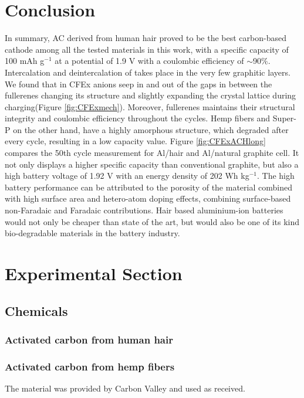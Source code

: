 \documentclass{article}
\begin{document}
\newpage
\section{Conclusion}
In summary, AC derived from human hair proved to be the best carbon-based cathode among all the tested materials in this work, with a specific capacity of 100 mAh g$^{-1}$ at a potential of 1.9 V with a coulombic efficiency of $\sim$90$\%$. Intercalation and deintercalation of  takes place in the very few graphitic layers. We found that in CFEx  anions seep in and out of the gaps in between the fullerenes changing its structure and slightly expanding the crystal lattice during charging(Figure \ref{fig:CFExmech}). Moreover, fullerenes maintains their structural integrity and coulombic efficiency throughout the cycles. Hemp fibers and Super-P on the other hand, have a highly amorphous structure, which degraded after every cycle, resulting in a low capacity value. Figure \ref{fig:CFExACHlong} compares the 50th cycle measurement for Al/hair and Al/natural graphite cell. It not only displays a higher specific capacity than conventional graphite, but also a high battery voltage of 1.92 V with an energy density of 202 Wh kg$^{-1}$. The high battery performance can be attributed to the porosity of the material combined with high surface area and hetero-atom doping effects, combining surface-based non-Faradaic and Faradaic contributions. Hair based aluminium-ion batteries would not only be cheaper than state of the art, but would also be one of its kind bio-degradable materials in the battery industry. 

\newpage

\section{Experimental Section}
\subsection{Chemicals}
\subsubsection*{Activated carbon from human hair}

\subsubsection*{Activated carbon from hemp fibers}
The material was provided by Carbon Valley and used as received.
\end{document}
